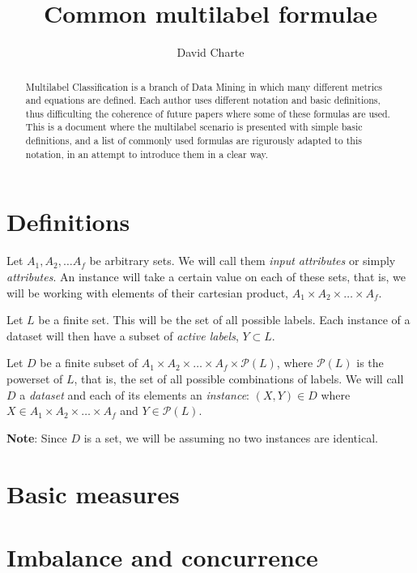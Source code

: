 \documentclass[]{article}
\title{Common multilabel formulae\\\vspace{0.5em}{\large \ldots{}under a common notation}}
\author{David Charte}
\date{}
\begin{document}
\maketitle
\begin{abstract}
Multilabel Classification is a branch of Data Mining in which many
different metrics and equations are defined. Each author uses different
notation and basic definitions, thus difficulting the coherence of
future papers where some of these formulas are used. This is a document
where the multilabel scenario is presented with simple basic
definitions, and a list of commonly used formulas are rigurously adapted
to this notation, in an attempt to introduce them in a clear way.
\end{abstract}

\section{Definitions}\label{definitions}

Let \(A_1, A_2, \dots A_f\) be arbitrary sets. We will call them
\emph{input attributes} or simply \emph{attributes}. An instance will
take a certain value on each of these sets, that is, we will be working
with elements of their cartesian product,
\(A_1\times A_2\times\dots\times A_f\).

Let \(L\) be a finite set. This will be the set of all possible labels.
Each instance of a dataset will then have a subset of \emph{active
labels}, \(Y \subset L\).

Let \(D\) be a finite subset of
\(A_1\times A_2\times\dots\times A_f\times\mathcal{P}(L)\), where
\(\mathcal{P}(L)\) is the powerset of \(L\), that is, the set of all
possible combinations of labels. We will call \(D\) a \emph{dataset} and
each of its elements an \emph{instance}: \((X, Y)\in D\) where
\(X\in A_1\times A_2\times\dots\times A_f\) and \(Y \in\mathcal{P}(L)\).

\textbf{Note}: Since \(D\) is a set, we will be assuming no two
instances are identical.

\section{Basic measures}\label{basic-measures}

\section{Imbalance and concurrence}\label{imbalance-and-concurrence}
\end{document}
